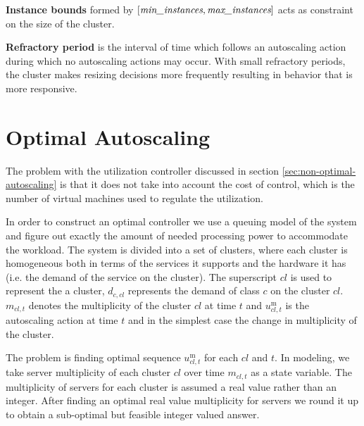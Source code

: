 \textbf{Instance bounds} formed by $[\text{{\it min\_instances}},\text{{\it max\_instances}}]$ acts as constraint on the size of the cluster. 

\textbf{Refractory period} is the interval of time which follows an autoscaling action during which no autoscaling actions may occur.  
With small refractory periods, the cluster makes resizing decisions more frequently resulting in behavior that is more responsive. 

\section{Optimal Autoscaling}   
The problem with the utilization controller discussed in section \ref{sec:non-optimal-autoscaling} is that it does not take into account the cost of control,  which is the number of virtual machines used to regulate the utilization. 

 In order to construct an optimal controller we use a queuing model of the system and figure out exactly the amount of needed processing power to accommodate the workload. 
 The system is divided into a set of clusters, where each cluster is homogeneous both in terms of the services it supports and the hardware it has (i.e. the demand of the service on the cluster).  
 The superscript $cl$ is used to represent the a cluster,  
 $d_{c,cl}$ represents the demand of class $c$ on the cluster $cl$.   
 $m_{cl,t}$ denotes the  multiplicity of the cluster $cl$ at time $t$ and 
 $u^\text{m}_{cl,t}$ is the autoscaling action at time $t$ and in the simplest case 
the change in multiplicity of the cluster. 
 
 
   
 The problem is finding optimal sequence $u^\text{m}_{cl,t}$ for each $cl$ and $t$. 
  In modeling, we take server multiplicity of each cluster $cl$ over time $m_{cl,t}$ as a state variable. The multiplicity of servers for each cluster is assumed a real value rather than an integer. After finding an optimal real value multiplicity for servers we round it up to obtain a sub-optimal but feasible integer valued answer.
 
